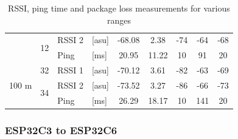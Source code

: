 \begin{table}[H]
\begin{tabular}{|c|c|l|l|c|c|c|c|c|}
        & \multirow{2}{*}{12} & RSSI 2 & [asu] & -68.08 & 2.38 & -74 & -64 & -68 \\\cline{3-9}
        && Ping & [ms] & 20.95 & 11.22 & 10 & 91 & 20 \\\hline\hline
        \multirow{3}{*}{100 m} & \multirow{1}{*}{32} & RSSI 1 & [asu] & -70.12 & 3.61 & -82 & -63 & -69 \\\cline{2-9}\cline{2-9}
        & \multirow{2}{*}{34} & RSSI 2 & [asu] & -73.52 & 3.27 & -86 & -66 & -73 \\\cline{3-9}
        && Ping & [ms] & 26.29 & 18.17 & 10 & 141 & 20 \\\hline
    \end{tabular}
    \vspace{\ftspace}
    \caption{RSSI, ping time and package loss measurements for various ranges}
    \label{tab:rssipingrange_esp32c3}
\end{table}

\subsubsection{ESP32C3 to ESP32C6}

